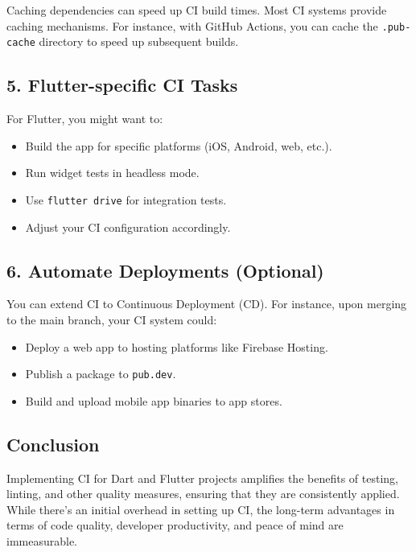\documentclass[
]{article}
\providecommand{\tightlist}{%
  \setlength{\itemsep}{0pt}\setlength{\parskip}{0pt}}
\begin{document}
Caching dependencies can speed up CI build times. Most CI systems
provide caching mechanisms. For instance, with GitHub Actions, you can
cache the \texttt{.pub-cache} directory to speed up subsequent builds.

\subsection{5. Flutter-specific CI
Tasks}\label{flutter-specific-ci-tasks}

For Flutter, you might want to:

\begin{itemize}
\tightlist
\item
  Build the app for specific platforms (iOS, Android, web, etc.).
\item
  Run widget tests in headless mode.
\item
  Use \texttt{flutter\ drive} for integration tests.
\item
  Adjust your CI configuration accordingly.
\end{itemize}

\subsection{6. Automate Deployments
(Optional)}\label{automate-deployments-optional}

You can extend CI to Continuous Deployment (CD). For instance, upon
merging to the main branch, your CI system could:

\begin{itemize}
\tightlist
\item
  Deploy a web app to hosting platforms like Firebase Hosting.
\item
  Publish a package to \texttt{pub.dev}.
\item
  Build and upload mobile app binaries to app stores.
\end{itemize}

\subsection{Conclusion}\label{conclusion-12}

Implementing CI for Dart and Flutter projects amplifies the benefits of
testing, linting, and other quality measures, ensuring that they are
consistently applied. While there's an initial overhead in setting up
CI, the long-term advantages in terms of code quality, developer
productivity, and peace of mind are immeasurable.
\end{document}
